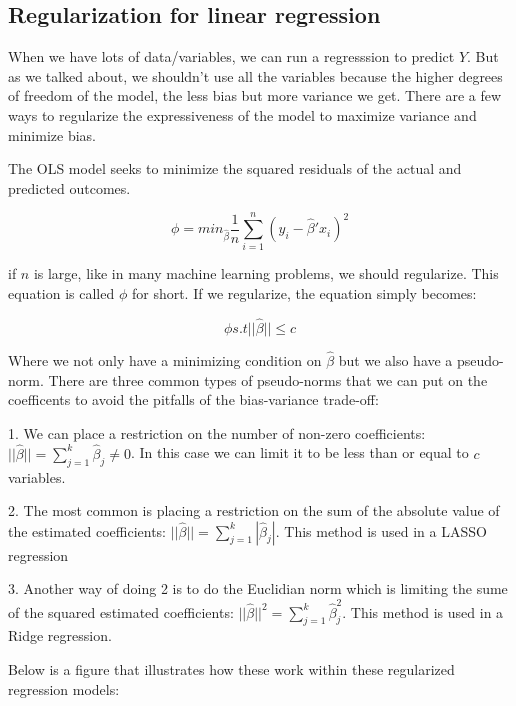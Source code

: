 \documentclass{article}
\begin{document}
\subsection{Regularization for linear regression}

When we have lots of data/variables, we can run a regresssion to predict $Y$. But as we talked about, we shouldn't use all the variables because the higher degrees of freedom of the model, the less bias but more variance we get. There are a few ways to regularize the expressiveness of the model to maximize variance and minimize bias. 

The OLS model seeks to minimize the squared residuals of the actual and predicted outcomes. 

\begin{equation}
  \phi =  min_{\hat{\beta}} \frac{1}{n} \sum_{i=1}^n (y_i - \hat{\beta}' x_i)^2
\end{equation}

if $n$ is large, like in many machine learning problems, we should regularize. This equation is called $\phi$ for short. If we regularize, the equation simply becomes:

\begin{equation}
    \phi s.t ||\hat{\beta}|| \leq c
\end{equation}

Where we not only have a minimizing condition on $\hat{\beta}$ but we also have a pseudo-norm. There are three common types of pseudo-norms that we can put on the coefficents to avoid the pitfalls of the bias-variance trade-off:

1. We can place a restriction on the number of non-zero coefficients: $||\hat{\beta}|| = \sum_{j=1}^k \hat{\beta}_j \neq 0$. In this case we can limit it to be less than or equal to $c$ variables.

2. The most common is placing a restriction on the sum of the absolute value of the estimated coefficients: $||\hat{\beta}|| = \sum_{j=1}^k |\hat{\beta}_j|$. This method is used in a LASSO regression

3. Another way of doing 2 is to do the Euclidian norm which is limiting the sume of the squared estimated coefficients:  $||\hat{\beta}||^2 = \sum_{j=1}^k \hat{\beta}^2_j$. This method is used in a Ridge regression.

Below is a figure that illustrates how these work within these regularized regression models:
\end{document}

